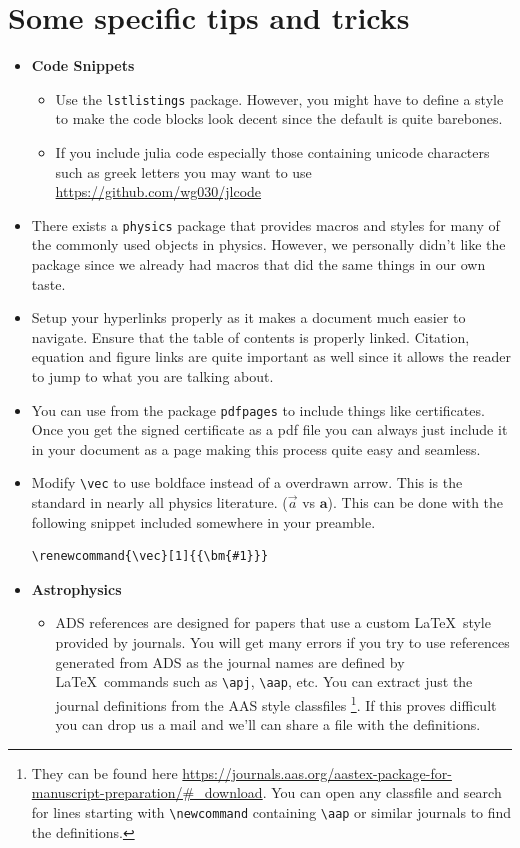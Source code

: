 \documentclass[english,10pt,a4paper, openany, oneside]{book}
\begin{document}
\newpage
\section{Some specific tips and tricks}
\begin{itemize}
	\item \textbf{Code Snippets}
	\begin{itemize}
		\item Use the \texttt{lstlistings} package. However, you might have to define a style to make the code blocks look decent since the default is quite barebones.
		\item If you include julia code especially those containing unicode characters such as greek letters you may want to use \url{https://github.com/wg030/jlcode}
	\end{itemize}
	\item There exists a \texttt{physics} package that provides macros and styles for many of the commonly used objects in physics. However, we personally didn't like the package since we already had macros that did the same things in our own taste.
	\item Setup your hyperlinks properly as it makes a document much easier to navigate. Ensure that the table of contents is properly linked. Citation, equation and figure links are quite important as well since it allows the reader to jump to what you are talking about. 
	\item You can use \lstinline|| from the package \verb*|pdfpages| to include things like certificates. Once you get the signed certificate as a pdf file you can always just include it in your document as a page making this process quite easy and seamless.
	\item Modify \verb|\vec| to use boldface instead of a overdrawn arrow. This is the standard in nearly all physics literature. ($\vec{a}$ vs $\bm{a}$). This can be done with the following snippet included somewhere in your preamble.
	\begin{lstlisting}[style=mystyle]
\renewcommand{\vec}[1]{{\bm{#1}}}\end{lstlisting}
	\item \textbf{Astrophysics}
	\begin{itemize}
		\item ADS references are designed for papers that use a custom \LaTeX\ style provided by journals. You will get many errors if you try to use references generated from ADS as the journal names are defined by \LaTeX\ commands such as \verb*|\apj|, \verb*|\aap|, etc. You can extract just the journal definitions from the AAS style classfiles \footnote{They can be found here \url{https://journals.aas.org/aastex-package-for-manuscript-preparation/#_download}. You can open any classfile and search for lines starting with \verb*|\newcommand| containing \verb*|\aap| or similar journals to find the definitions.}. If this proves difficult you can drop us a mail and we'll can share a file with the definitions.

\end{itemize}
\end{itemize}
\end{document}
